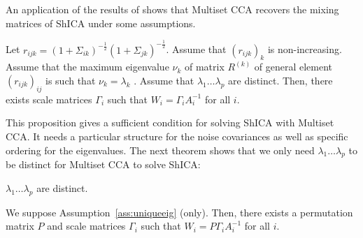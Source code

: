 An application of the results of \cite{li2009joint} shows that Multiset CCA recovers the mixing matrices of ShICA under some assumptions.
%
\begin{proposition}
Let $r_{ijk} = (1 + \Sigma_{ik})^{-\frac12} (1 + \Sigma_{jk})^{-\frac12}$.
Assume that $(r_{ijk})_k$ is non-increasing. Assume that the maximum eigenvalue $\nu_k$ of matrix $R^{(k)}$ of general element $(r_{ijk})_{ij}$ is such that  $\nu_k = \lambda_k$ 
.
Assume that $\lambda_1 \dots \lambda_p$ are distinct.
Then, there exists scale matrices $\Gamma_i$ such that $W_i = 
\Gamma_i A_i^{-1}$ for all $i$.
\end{proposition}
This proposition gives a sufficient condition for solving ShICA with Multiset CCA. It needs a particular structure for the noise covariances as well as specific ordering for the eigenvalues. The next theorem shows that we only need $\lambda_1 \dots \lambda_p$ to be distinct for Multiset CCA to solve ShICA:
\begin{assumption}
  \label{ass:uniqueeig}
$\lambda_1 \dots \lambda_p$ are distinct.
\end{assumption}
\begin{theorem}
  \label{th:eig}
  We suppose
  Assumption~\ref{ass:uniqueeig} (only). Then, there exists a permutation matrix $P$ and scale matrices $\Gamma_i$ such that $W_i = P\Gamma_i A_i^{-1}$ for all $i$.
\end{theorem}
\label{proof:eig}
